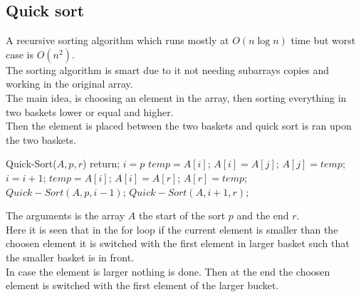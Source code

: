 \documentclass[12pt, a4paper]{article}
\begin{document}
			\subsection{Quick sort}
				A recursive sorting algorithm which runs mostly at $O(n\log n)$ time but worst case is $O(n^2)$.\\
				The sorting algorithm is smart due to it not needing subarrays copies and working in the original array.\\
				The main idea, is choosing an element in the array, then sorting everything in two baskets lower or equal and higher.\\
				Then the element is placed between the two baskets and quick sort is ran upon the two baskets.
				\begin{algorithmic}[1]
					\State Quick-Sort($A,p,r$)
					 \State return; \EndIf
					\State $i = p$
					\For {$j=p$ to $r$}
						\If {$A[j] \leq x$}
							\State $temp = A[i]$;
							\State $A[i] = A[j]$;
							\State $A[j] = temp$;
							\State $i=i+1$;
						\EndIf
					\EndFor
					\State $temp = A[i]$;
					\State $A[i] = A[r]$;
					\State $A[r] = temp$;
					\State $Quick-Sort(A,p,i-1)$;
					\State $Quick-Sort(A,i+1,r)$;
				\end{algorithmic}
				The arguments is the array $A$ the start of the sort $p$ and the end $r$.\\
				Here it is seen that in the for loop if the current element is smaller than the choosen element it is switched with the first element in larger basket such that the smaller basket is in front.\\
				In case the element is larger nothing is done. Then at the end the choosen element is switched with the first element of the larger bucket.
\end{document}
